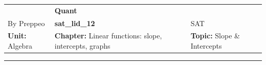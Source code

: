 \documentclass[11pt,paper=a4,answers]{exam}
\begin{document}
\begin{center}
    \centering
    \renewcommand{\arraystretch}{1.5}
    \begin{tabularx}{\textwidth}{YYY}
    & \normalsize\bf{{\Large{{Quant}}}} & \\
    By Preppeo & \normalsize\bf{{sat\_lid\_12}} & SAT\\
    \normalsize{{\textbf{{Unit:}} Algebra}} & \normalsize{{\textbf{{Chapter:}} Linear functions: slope, intercepts, graphs}} & \normalsize{{\textbf{{Topic:}} Slope \& Intercepts}} \\
    \end{tabularx}
\end{center}
\par\noindent\rule{\textwidth}{1pt}
\end{document}
